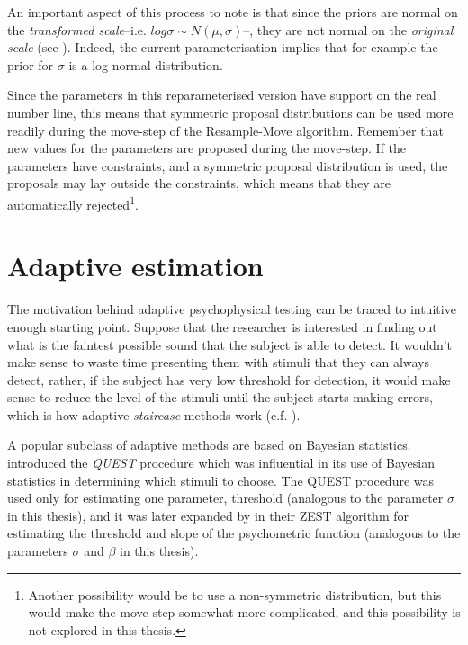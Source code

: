\documentclass{article}\usepackage{knitr}
\begin{document}
An important aspect of this process to note is that since the priors are normal on the \textit{transformed scale}--i.e. $log\sigma \sim N(\mu, \sigma)$--, they are not normal on the \textit{original scale} (see \citealt[pp. 729 - 732]{kruschke2015}). Indeed, the current parameterisation implies that for  example the prior for $\sigma$ is a log-normal distribution.

Since the parameters in this reparameterised version have support on the real number line, this means that symmetric proposal distributions can be used more readily during the move-step of the Resample-Move algorithm. Remember that new values for the parameters are proposed during the move-step. If the parameters have constraints, and a symmetric proposal distribution is used, the proposals may lay outside the constraints, which means that they are automatically rejected\footnote{Another possibility would be to use a non-symmetric distribution, but this would make the move-step somewhat more complicated, and this possibility is not explored in this thesis.}. 


\newpage


\section{Adaptive estimation}
\label{sec:adaptive}

The motivation behind adaptive psychophysical testing can be traced to intuitive enough starting point. Suppose that the researcher is interested in finding out what is the faintest possible sound that the subject is able to detect. It wouldn't make sense to waste time presenting them with stimuli that they can always detect, rather, if the subject has very low threshold for detection, it would make sense to reduce the level of the stimuli until the subject starts making errors, which is how adaptive \textit{staircase} methods work (c.f. \citep[Chapter 5]{kingdomprins2010}).

A popular subclass of adaptive methods are based on Bayesian statistics. \cite{watson1983} introduced the \textit{QUEST} procedure which was influential in its use of Bayesian statistics in determining which stimuli to choose. The QUEST procedure was used only for estimating one parameter, threshold (analogous to the parameter $\sigma$ in this thesis),  and it was later expanded by \citet{king_smith1997} in their ZEST algorithm for estimating the threshold and slope of the psychometric function (analogous to the parameters $\sigma$ and $\beta$ in this thesis). 
\end{document}
